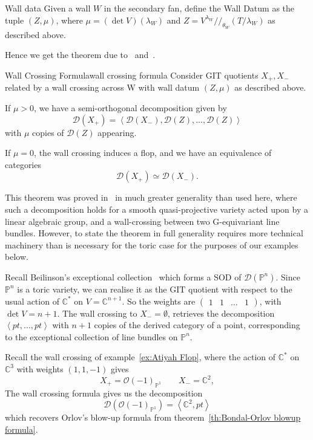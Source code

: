 \begin{definition}{Wall data}{}
	Given a wall $W$ in the secondary fan, define the Wall Datum as the tuple $(Z, \mu)$, where $\mu = (\det V)(\lambda_W)$ and $Z = V^{\lambda_{W}} / /_{\theta_{W}} \left( T/ \lambda_{W}\right)$ as described above. 
\end{definition}

Hence we get the theorem due to~\cite{halpernleistner2014derived} and~\cite{ballard2014variation}.

\begin{theorem}{Wall Crossing Formula}{wall crossing formula}
Consider GIT quotients $X_{+},X_{-}$  related by a wall crossing across W  with wall datum $(Z, \mu)$ as described above. 

If $\mu > 0$, we have a semi-orthogonal decomposition given by $$\mathcal{D}(X_{+}) = \left< \mathcal{D}(X_{-}),\mathcal{D}(Z) , \dots, \mathcal{D}(Z)  \right>$$ with $\mu$ copies of $\mathcal{D}(Z)$ appearing.

If $\mu = 0$, the wall crossing induces a flop, and we have an equivalence of categories $$\mathcal{D}(X_{+})\simeq \mathcal{D}(X_-).$$
\end{theorem}

This theorem was proved in~\cite{ballard2014variation} in much greater generality than used here, where such a decomposition holds for a smooth quasi-projective variety acted upon by a linear algebraic group, and a wall-crossing between two G-equivariant line bundles. However, to state the theorem in full generality requires more technical machinery than is necessary for the toric case for the purposes of our examples below. 

\begin{example}{}{}
    Recall Beilinson's exceptional collection~\cite{Beilinson1978} which forms a SOD of $\mathcal{D}(\mathbb{P}^n)$. Since $\mathbb{P}^n$ is a toric variety, we can realise it as the GIT quotient with respect to the usual action of $\mathbb{C}^*$ on $V = \mathbb{C}^{n+1}$. So the weights are $\begin{pmatrix}1 & 1 &\dots &1\end{pmatrix}$, with $\det V = n+1$. The wall crossing to $X_{-}=\emptyset$, retrieves the decomposition $\left< pt, \dots,pt \right>$ with $n+1$ copies of the derived category of a point, corresponding to the exceptional collection of line bundles on $\mathbb{P}^n$. 
\end{example}

\begin{example}{}{}
	Recall the wall crossing of example~\ref*{ex:Atiyah Flop}, where the action of $\mathbb{C}^{*}$ on $\mathbb{C}^3$ with weights $(1,1,-1)$ gives $$X_{+}= \mathcal{O}(-1)_{\mathbb{P}^{1}} \qquad X_{-}= \mathbb{C}^2, $$ The wall crossing formula gives us the decomposition $$\mathcal{D}(\mathcal{O}(-1)_{\mathbb{P}^{1}})= \left< \mathbb{C}^{2}, pt \right> $$ which recovers Orlov's blow-up formula from theorem~\ref{th:Bondal-Orlov blowup formula}.
\end{example}

